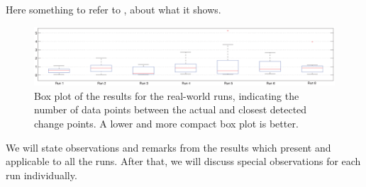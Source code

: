 Here something to refer to , about what it shows.

\begin{figure}
\centering
  \includegraphics[width=1\textwidth]{./Figures/chapter6/data_collection/boxplot_results_real_world_runs.eps}
  \caption[Box plot results real-world runs]{Box plot of the results for the real-world runs, indicating the number of data points between the actual and closest detected change points. A lower and more compact box plot is better.}
  \label{fig:boxplot_real_world_runs}
\end{figure}

We will state observations and remarks from the results which present and applicable to all the runs.
After that, we will discuss special observations for each run individually.


